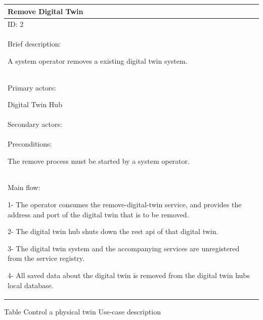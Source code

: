 \documentclass{article}
\newcounter{Table}
\renewcommand\theTable{\arabic{Table}}
\begin{document}
\begin{flushleft}
\tablefirsthead{}
\tablehead{}
\tabletail{}
\tablelasttail{}
\begin{supertabular}{|m{6.01226in}|}
\hline
Remove Digital Twin\\\hline
ID: 2 \\\hline
Brief description:

A system operator removes a existing digital twin system.\\\hline

Primary actors:

Digital Twin Hub \\\hline
Secondary actors:

\\\hline
Preconditions:

The remove process must be started by a system operator. \\\hline
Main flow:

1- The operator consumes the remove-digital-twin service, and provides the address and port of the digital twin that is to be removed.

2- The digital twin hub shuts down the rest api of that digital twin.

3- The digital twin system and the accompanying services are unregistered from the service registry.

4- All saved data about the digital twin is removed from the digital twin hubs local database.

\\\hline
\end{supertabular}
\end{flushleft}

\newpage

Table \stepcounter{Table}{\theTable} Control a physical twin Use-case description
\end{document}

